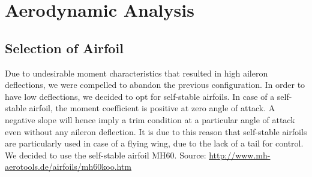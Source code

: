 \section{Aerodynamic Analysis}
\subsection{Selection of Airfoil}
Due to undesirable moment characteristics that resulted in high aileron deflections, we were compelled to abandon the previous configuration. In order to have low deflections, we decided to opt for self-stable airfoils. In case of a self-stable airfoil, the moment coefficient is positive at zero angle of attack. A negative slope will hence imply a trim condition at a particular angle of attack even without any aileron deflection. It is due to this reason that self-stable airfoils are particularly used in case of a flying wing, due to the lack of a tail for control.\\
We decided to use the self-stable airfoil MH60. Source: \url{http://www.mh-aerotools.de/airfoils/mh60koo.htm}
